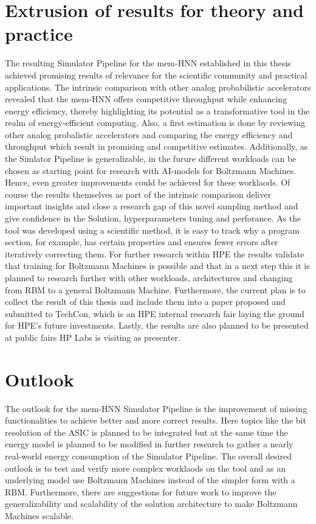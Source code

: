 \section{Extrusion of results for theory and practice}
The resulting Simulator Pipeline for the \ac{mem-HNN} established in this thesis achieved 
promising results of relevance for the scientific community and practical applications. 
The intrinsic comparison with other analog probabilistic accelerators revealed that the \ac{mem-HNN} offers competitive throughput while enhancing energy efficiency,
thereby highlighting its potential as a transformative tool in the realm of energy-efficient computing.
Also, a first estimation is done by reviewing other analog probalistic accelerators and comparing the energy efficiency and throughput which result in promising and competitive estimates. 
Additionally, as the Simlator Pipeline is generalizable, in the furure different workloads can be chosen as starting point for research with AI-models 
for Boltzmann Machines. 
Hence, even greater improvements could be achieved for these worklaods.
Of course the results themselves as part of the intrinsic comparison deliver important insights and close a research gap of this novel sampling method 
and give confidence in the Solution, hyperparameters tuning and perforance. 
As the tool was developed using a scientific method, it is easy to track why a program section, for example, has certain properties and ensures fewer errors after iteratively correcting them.
For further research within HPE the results validate that training for Boltzmann Machines is possible and that in 
a next step this it is planned to research further with other workloads, architectures and changing from \ac{RBM} to a general Boltzmann Machine.
Furthermore, the current plan is to collect the result of this thesis and include them into a paper 
proposed and submitted to TechCon, which is an HPE internal research fair laying the ground for HPE's future investments.
Lastly, the results are also planned to be presented at public fairs HP Labs is visiting as presenter. 

\section{Outlook}
The outlook for the \ac{mem-HNN} Simulator Pipeline is the improvement of missing functionalities to achieve better and more correct results. 
Here topics like the bit resolution of the \ac{ASIC} is planned to be integrated but at the same time the energy model is planned
to be modified in further research to gather a nearly real-world energy consumption of the Simulator Pipeline.
The overall desired outlook is to test and verify more complex worklaods on the tool and as an underlying model use Boltzmann Machines 
instead of the simpler form with a \ac{RBM}.
Furthermore, there are suggestions for future work to improve the generalizability and scalability of the solution architecture to make Boltzmann Machines scalable.
